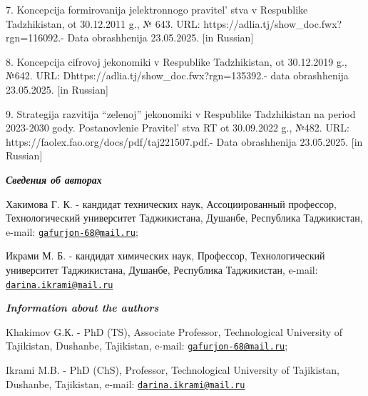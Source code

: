 7. Koncepcija formirovanija jelektronnogo pravitel' stva v
Respublike Tadzhikistan, ot 30.12.2011 g., № 643. URL:
https://adlia.tj/show\_doc.fwx?rgn=116092.- Data obrashhenija
23.05.2025. {[}in Russian{]}

8. Koncepcija cifrovoj jekonomiki v Respublike Tadzhikistan, ot
30.12.2019 g., №642. URL: Dhttps://adlia.tj/show\_doc.fwx?rgn=135392.-
data obrashhenija 23.05.2025. {[}in Russian{]}

9. Strategija razvitija ``zelenoj'' jekonomiki v Respublike Tadzhikistan
na period 2023-2030 gody. Postanovlenie Pravitel' stva RT
ot 30.09.2022 g., №482. URL:
https://faolex.fao.org/docs/pdf/taj221507.pdf.- Data obrashhenija
23.05.2025. {[}in Russian{]}

\emph{{\bfseries Сведения об авторах}}

Хакимова Г. К. - кандидат технических наук, Ассоциированный профессор,
Технологический университет Таджикистана, Душанбе, Республика
Таджикистан, e-mail:
\href{mailto:gafurjon-68@mail.ru}{\nolinkurl{gafurjon-68@mail.ru}};

Икрами М. Б. - кандидат химических наук, Профессор, Технологический
университет Таджикистана, Душанбе, Республика Таджикистан, e-mail:
\href{mailto:darina.ikrami@mail.ru}{\nolinkurl{darina.ikrami@mail.ru}}

\emph{{\bfseries Information about the authors}}

Khakimov G.К. - PhD (TS), Associate Professor, Technological University
of Tajikistan, Dushanbe, Tajikistan, e-mail:
\href{mailto:gafurjon-68@mail.ru}{\nolinkurl{gafurjon-68@mail.ru}};

Ikrami M.B. - PhD (ChS), Professor, Technological University of
Tajikistan, Dushanbe, Tajikistan, e-mail:
\href{mailto:darina.ikrami@mail.ru}{\nolinkurl{darina.ikrami@mail.ru}}\